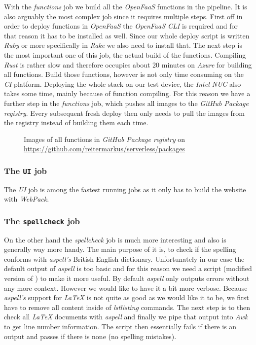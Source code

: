 With the \textit{functions} job we build all the \textit{OpenFaaS} functions in the pipeline. It is
also arguably the most complex job since it requires multiple steps. First off in order to deploy
functions in \textit{OpenFaaS} the \textit{OpenFaaS CLI} is required and for that reason it has to
be installed as well. Since our whole deploy script is written \textit{Ruby} or more specifically in
\textit{Rake} we also need to install that. The next step is the most important one of this job, the
actual build of the functions. Compiling \textit{Rust} is rather slow and therefore occupies about
20 minutes on \textit{Azure} for building all functions. Build those functions, however is not only
time consuming on the \textit{CI} platform. Deploying the whole stack on our test device, the
\textit{Intel NUC} also takes some time, mainly because of function compiling. For this reason we
have a further step in the \textit{functions} job, which pushes all images to the \textit{GitHub
Package registry}. Every subsequent fresh deploy then only needs to pull the images from the
registry instead of building them each time.

\begin{figure}[H]
  \centering
  \caption{Images of all functions in \textit{GitHub Package registry} on \url{https://github.com/reitermarkus/serverless/packages}}
\end{figure}

\subsubsection{The \texttt{UI} job}

The \textit{UI} job is among the fastest running jobs as it only has to build the website with
\textit{WebPack}.

\subsubsection{The \texttt{spellcheck} job}

On the other hand the \textit{spellcheck} job is much more interesting and also is generally way
more handy. The main purpose of it is, to check if the spelling conforms with \textit{aspell's}
British English dictionary. Unfortunately in our case the default output of \textit{aspell} is too
basic and for this reason we need a script (modified version of \cite{aspell-awk}) to make it more
useful. By default \textit{aspell} only outputs errors without any more context. However we would
like to have it a bit more verbose. Because \textit{aspell's} support for \textit{LaTeX} is not
quite as good as we would like it to be, we first have to remove all content inside of
\textit{lstlisting} commands. The next step is to then check all \textit{LaTeX} documents with
\textit{aspell} and finally we pipe that output into \textit{Awk} to get line number information.
The script then essentially fails if there is an output and passes if there is none (no spelling
mistakes).

